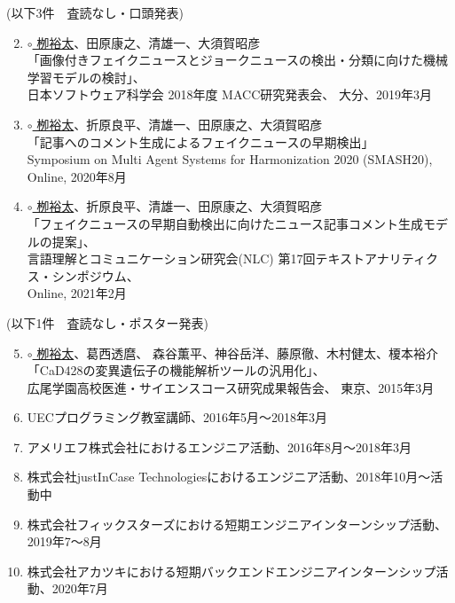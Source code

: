 (以下3件　査読なし・口頭発表)
\vspace{-3mm}
\begin{enumerate}
    \setcounter{enumi}{1}
    \setlength{\parskip}{0cm}
    \setlength{\itemsep}{0cm}
    \item \underline{$\circ$ 栁裕太}、田原康之、清雄一、大須賀昭彦\\
        「画像付きフェイクニュースとジョークニュースの検出・分類に向けた機械学習モデルの検討」、\\
        日本ソフトウェア科学会 2018年度 MACC研究発表会、
        大分、2019年3月 \label{enum:MACC}
    \item \underline{$\circ$ 栁裕太}、折原良平、清雄一、田原康之、大須賀昭彦\\
        「記事へのコメント生成によるフェイクニュースの早期検出」\\
        Symposium on Multi Agent Systems for Harmonization 2020 (SMASH20), Online, 2020年8月 \label{enum:SMASH}
    \item \underline{$\circ$ 栁裕太}、折原良平、清雄一、田原康之、大須賀昭彦\\
        「フェイクニュースの早期自動検出に向けたニュース記事コメント生成モデルの提案」、\\
        言語理解とコミュニケーション研究会(NLC) 第17回テキストアナリティクス・シンポジウム、\\
        Online, 2021年2月 \label{enum:NLC}
\end{enumerate}
(以下1件　査読なし・ポスター発表)
\vspace{-3mm}
\begin{enumerate}
    \setcounter{enumi}{4}
    \setlength{\parskip}{0cm}
    \setlength{\itemsep}{0cm}
    \item \underline{$\circ$ 栁裕太}、葛西透麿、 森谷薫平、神谷岳洋、藤原徹、木村健太、榎本裕介\\
        「CaD428の変異遺伝子の機能解析ツールの汎用化」、\\
        広尾学園高校医進・サイエンスコース研究成果報告会、
        東京、2015年3月 \label{enum:hg}
\end{enumerate}

\begin{enumerate}
    \setcounter{enumi}{5}
    \setlength{\parskip}{0cm}
    \setlength{\itemsep}{0cm}
    \item UECプログラミング教室講師、2016年5月〜2018年3月\cite{uecprog} \label{enum:prog}
    \item アメリエフ株式会社におけるエンジニア活動、2016年8月〜2018年3月\cite{amelieff} \label{enum:amelieff}
    \item 株式会社justInCase Technologiesにおけるエンジニア活動、2018年10月〜活動中\cite{jic-tech} \label{enum:jict}
    \item 株式会社フィックスターズにおける短期エンジニアインターンシップ活動、2019年7〜8月 \label{enum:fixstars}
    \item 株式会社アカツキにおける短期バックエンドエンジニアインターンシップ活動、2020年7月 \label{enum:ak}
\end{enumerate}

